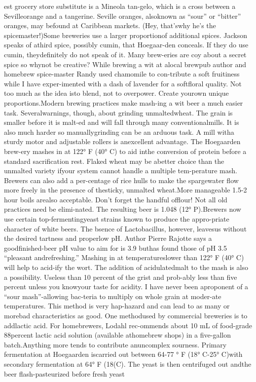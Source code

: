 \documentclass[a4paper,parskip=half]{scrartcl}
\begin{document}
est grocery store substitute is a Mineola tan-gelo, which is a cross between a Sevilleorange and a tangerine. Seville oranges, alsoknown as “sour” or “bitter” oranges, may befound at Caribbean markets. (Hey, that’swhy he’s the spicemaster!)Some breweries use a larger proportionof additional spices. Jackson speaks of athird spice, possibly cumin, that Hoegaar-den conceals. If they do use cumin, theydefinitely do not speak of it. Many brew-eries are coy about a secret spice so whynot be creative? While brewing a wit at alocal brewpub author and homebrew spice-master Randy used chamomile to con-tribute a soft fruitiness while I have exper-imented with a dash of lavender for a softfloral quality. Not too much as the idea isto blend, not to overpower. Create yourown unique proportions.Modern brewing practices make mash-ing a wit beer a much easier task. Severalwarnings, though, about grinding unmaltedwheat. The grain is smaller before it is malt-ed and will fall through many conventionalmills. It is also much harder so manuallygrinding can be an arduous task. A mill witha sturdy motor and adjustable rollers is anexcellent advantage. The Hoegaarden brew-ery mashes in at 122° F (40° C) to aid inthe conversion of protein before a standard
sacrification rest. Flaked wheat may be abetter choice than the unmalted variety ifyour system cannot handle a multiple tem-perature mash. Brewers can also add a per-centage of rice hulls to make the spargewater flow more freely in the presence of thesticky, unmalted wheat.More manageable 1.5-2 hour boils arealso acceptable. Don’t forget the handful offlour! Not all old practices need be elimi-nated. The resulting beer is 1.048 (12° P).Brewers now use certain top-fermentingyeast strains known to produce the appro-priate character of white beers. The
bsence of Lactobacillus, however, leavesus without the desired tartness and properlow pH. Author Pierre Rajotte says a goodfinished-beer pH value to aim for is 3.9 buthas found those of pH 3.5 “pleasant andrefreshing.” Mashing in at temperatureslower than 122° F (40° C) will help to acid-ify the wort. The addition of acidulatedmalt to the mash is also a possibility. Useless than 10 percent of the grist and prob-ably less than five percent unless you knowyour taste for acidity. I have never been aproponent of a “sour mash”-allowing bac-teria to multiply on whole grain at moder-ate temperatures. This method is very hap-hazard and can lead to as many or morebad characteristics as good. One methodused by commercial breweries is to addlactic acid. For homebrewers, Lodahl rec-ommends about 10 mL of food-grade 88percent lactic acid solution (available athomebrew shops) in a five-gallon batch.Anything more tends to contribute anuncomplex sourness. Primary fermentation at Hoegaarden iscarried out between 64-77 ° F (18° C-25° C)with secondary fermentation at 64° F (18(C). The yeast is then centrifuged out andthe beer flash-pasteurized before fresh yeast
\end{document}
